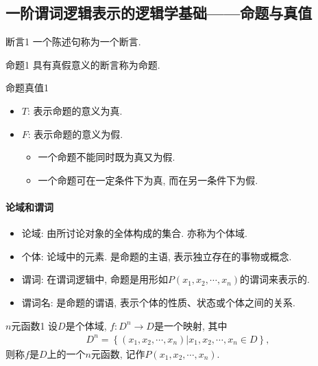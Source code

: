 \subsection{一阶谓词逻辑表示的逻辑学基础——命题与真值}
\begin{mydef}{断言}{1}
一个陈述句称为一个断言.
\end{mydef}
\begin{mydef}{命题}{1}
具有真假意义的断言称为命题.
\end{mydef}
\begin{myprop}{命题真值}{1}
\begin{itemize}
    \item $T$: 表示命题的意义为真.
    \item $F$: 表示命题的意义为假.
        \begin{itemize}
            \item 一个命题不能同时既为真又为假.
            \item 一个命题可在一定条件下为真, 而在另一条件下为假.
        \end{itemize}
\end{itemize}
\end{myprop}

\paragraph{论域和谓词}
\begin{itemize}
\item 论域: 由所讨论对象的全体构成的集合. 亦称为个体域.
\item 个体: 论域中的元素. 是命题的主语, 表示独立存在的事物或概念.
\item 谓词: 在谓词逻辑中, 命题是用形如$P(x_1,x_2,\cdots,x_n)$的谓词来表示的.
\item 谓词名: 是命题的谓语, 表示个体的性质、状态或个体之间的关系.
\end{itemize}

\begin{mydef}{$n$元函数}{1}
     设$D$是个体域, $f: D^n\rightarrow D$是一个映射, 其中
\begin{align}
  D^{n}=\left\{\left(x_{1}, x_{2}, \cdots, x_{n}\right) | x_{1}, x_{2}, \cdots, x_{n} \in D\right\},
\end{align}
则称$f$是$D$上的一个$n$元函数, 记作$P(x_1,x_2,\cdots,x_n)$.
\end{mydef}

